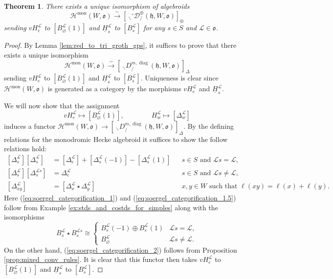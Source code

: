 \documentclass{amsart}
\newcommand{\scrH}{\mathcal{H}}
\newcommand{\scrL}{\mathcal{L}}
\newcommand{\fr}[1]{\mathfrak{#1}}
\DeclareMathOperator{\diag}{diag}
\DeclareMathOperator{\mon}{mon}
\newcommand{\grEWmon}[2]{\:_{#1 \backslash} \!\! {}^{\circ} \mathcal{D}_{/ #2} }
\newcommand{\DDBE}[2]{\:_{#1 \backslash} D_{/ #2}^{m, \diag}}
\newcommand{\uH}{\underline{H}}
\renewcommand{\emptyset}{\varnothing}
\newtheorem{theorem}[subsubsection]{Theorem}
\theoremstyle{definition}
\numberwithin{equation}{subsection}
\begin{document}
\begin{theorem}\label{thm:soergel_categorification}
    There exists a unique isomorphism of algebroids
    \[\scrH^{\mon} (W, \fr{o}) \stackrel{\sim}{\to} [\grEWmon{}{}^{\oplus} (\fr{h}, W, \fr{o}) ]_{\oplus}\]
    sending $v H_e^{\scrL}$ to $[B_{\emptyset}^{\scrL} (1)]$ and $\uH_s^{\scrL}$ to $[B_s^{\scrL}]$ for any $s \in S$ and $\scrL \in \fr{o}$.
\end{theorem}
\begin{proof}
    By Lemma \ref{lem:red_to_tri_groth_gps}, it suffices to prove that there exists a unique isomorphism
    \[\scrH^{\mon} (W, \fr{o}) \stackrel{\sim}{\to} [\DDBE{}{} (\fr{h}, W, \fr{o}) ]_{\Delta}\]
    sending $vH_e^{\scrL}$ to $[B_{\emptyset}^{\scrL} (1)]$ and $\uH_s^{\scrL}$ to $[B_s^{\scrL}]$. Uniqueness is clear since $\scrH^{\mon} (W, \fr{o})$ is generated as a category by the morphisms $vH_e^{\scrL}$ and $\uH_s^{\scrL}$.

    We will now show that the assignment 
    \[vH_e^{\scrL} \mapsto [B_{\emptyset}^{\scrL} (1)], \qquad\qquad H_w^{\scrL} \mapsto [\Delta_w^{\scrL}]\]
    induces a functor $\scrH^{\mon} (W, \fr{o}) \to [\DDBE{}{} (\fr{h}, W, \fr{o}) ]_{\Delta}$.
    By the defining relations for the monodromic Hecke algebroid it suffices to show the follow relations hold:
    \begin{align}\label{eq:soergel_categorification_1}
        [\Delta_s^{\scrL}][\Delta_s^{\scrL}] &= [\Delta_e^{\scrL}] + [\Delta_s^{\scrL} (-1)] - [\Delta_s^{\scrL} (1)] & &s \in S \text{ and } \scrL s = \scrL, \\ \label{eq:soergel_categorification_1.5}
        [\Delta_s^{\scrL}][\Delta_s^{\scrL s}] &= \Delta_e^{\scrL} & &s \in S \text{ and }  \scrL s \neq \scrL,\\  \label{eq:soergel_categorification_2}
        [\Delta_{xy}^{\scrL}] &= [\Delta_x^{\scrL} \star \Delta_y^{\scrL}] & &x,y \in W\text{ such that }\ell (xy) = \ell (x) + \ell (y).
    \end{align}
    Here (\ref{eq:soergel_categorification_1}) and (\ref{eq:soergel_categorification_1.5}) follow from Example \ref{ex:stds_and_costds_for_simples} along with the isomorphisms 
    \[ B_s^{\scrL} \star B_s^{\scrL s} \cong \begin{cases} B_s^{\scrL} (-1) \oplus B_s^{\scrL} (1) & \scrL s = \scrL, \\ B_{\emptyset}^{\scrL} & \scrL s \neq \scrL.\end{cases}\]
    On the other hand, (\ref{eq:soergel_categorification_2}) follows from Proposition \ref{prop:mixed_conv_rules}.
    It is clear that this functor then takes $vH_e^{\scrL}$ to $[B_{\emptyset}^{\scrL} (1)]$ and $\uH_s^{\scrL}$ to $[B_s^{\scrL}]$.


\end{proof}
\end{document}
